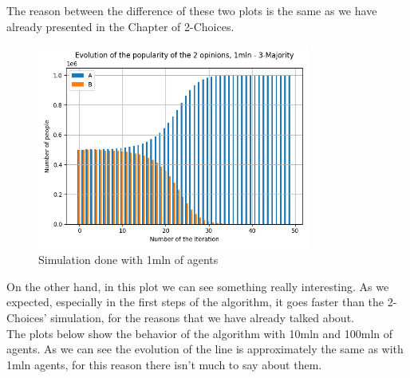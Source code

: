 The reason between the difference of these two plots is the same as we have already presented in the Chapter of 2-Choices.

\begin{figure}[H]
     \centering
     \includegraphics[width=0.80\textwidth,height=0.37\textheight]{img/svg/3_Majority/1mln/barChart.png}
     \caption{Simulation done with 1mln of agents}
\end{figure}

On the other hand, in this plot we can see something really interesting. As we expected, especially in the first steps of the algorithm, it goes faster than the 2-Choices’ simulation, for the reasons that we have already talked about.\\

The plots below show the behavior of the algorithm with 10mln and 100mln of agents. As we can see the evolution of the line is approximately the same as with 1mln agents, for this reason there isn’t much to say about them.

